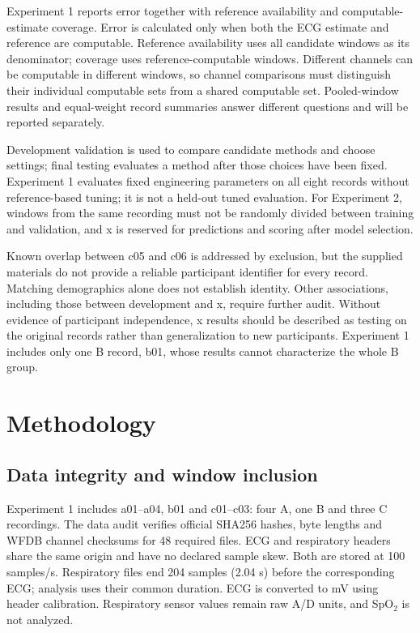 Experiment 1 reports error together with reference availability and computable-estimate coverage. Error is calculated only when both the ECG estimate and reference are computable. Reference availability uses all candidate windows as its denominator; coverage uses reference-computable windows. Different channels can be computable in different windows, so channel comparisons must distinguish their individual computable sets from a shared computable set. Pooled-window results and equal-weight record summaries answer different questions and will be reported separately.

Development validation is used to compare candidate methods and choose settings; final testing evaluates a method after those choices have been fixed. Experiment 1 evaluates fixed engineering parameters on all eight records without reference-based tuning; it is not a held-out tuned evaluation. For Experiment 2, windows from the same recording must not be randomly divided between training and validation, and x is reserved for predictions and scoring after model selection.

Known overlap between c05 and c06 is addressed by exclusion, but the supplied materials do not provide a reliable participant identifier for every record. Matching demographics alone does not establish identity. Other associations, including those between development and x, require further audit. Without evidence of participant independence, x results should be described as testing on the original records rather than generalization to new participants. Experiment 1 includes only one B record, b01, whose results cannot characterize the whole B group.

\clearpage
\chapter{Methodology}
\section{Data integrity and window inclusion}
Experiment 1 includes a01--a04, b01 and c01--c03: four A, one B and three C recordings. The data audit verifies official SHA256 hashes, byte lengths and WFDB channel checksums for 48 required files. ECG and respiratory headers share the same origin and have no declared sample skew. Both are stored at 100 samples/s. Respiratory files end 204 samples (2.04 s) before the corresponding ECG; analysis uses their common duration. ECG is converted to mV using header calibration. Respiratory sensor values remain raw A/D units, and SpO$_2$ is not analyzed.

